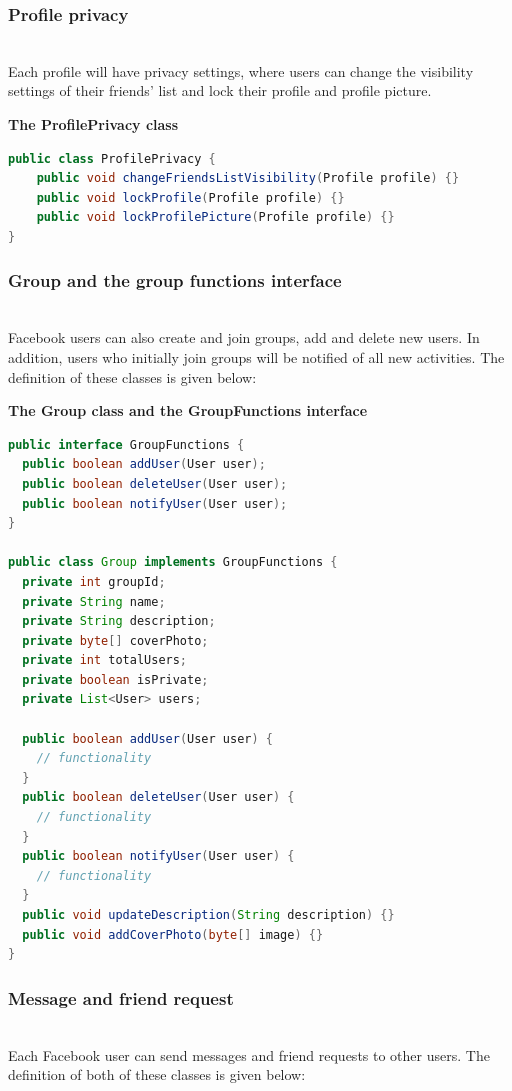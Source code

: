 \subsubsection{Profile privacy}\label{julu7b82zRwsJjYIajaE4-1}
\\
Each profile will have privacy settings, where users can change the visibility settings of their friends' list and lock their profile and profile picture.

\textbf{The ProfilePrivacy class}

\begin{lstlisting}[language=Java]
public class ProfilePrivacy {
    public void changeFriendsListVisibility(Profile profile) {}
    public void lockProfile(Profile profile) {}
    public void lockProfilePicture(Profile profile) {}
}
\end{lstlisting}

\subsubsection{Group and the group functions interface}\label{FlqX3PLuJU_QNryN7B_Rq-1}
\\
Facebook users can also create and join groups, add and delete new users. In addition, users who initially join groups will be notified of all new activities. The definition of these classes is given below:

\textbf{The Group class and the GroupFunctions interface}

\begin{lstlisting}[language=Java]
public interface GroupFunctions {
  public boolean addUser(User user);
  public boolean deleteUser(User user);
  public boolean notifyUser(User user);
}

public class Group implements GroupFunctions {
  private int groupId;
  private String name;
  private String description;
  private byte[] coverPhoto;
  private int totalUsers;
  private boolean isPrivate;
  private List<User> users;

  public boolean addUser(User user) {
    // functionality
  }
  public boolean deleteUser(User user) {
    // functionality
  }
  public boolean notifyUser(User user) {
    // functionality
  }
  public void updateDescription(String description) {}
  public void addCoverPhoto(byte[] image) {}
}
\end{lstlisting}

\subsubsection{Message and friend request}\label{FlqX3PLuJU_QNryN7B_Rq-2}
\\
Each Facebook user can send messages and friend requests to other users. The definition of both of these classes is given below:

